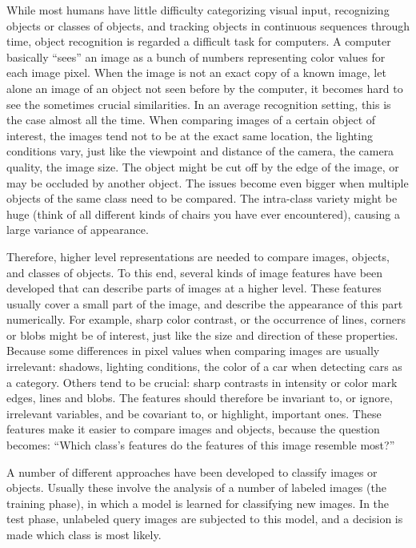 While most humans have little difficulty categorizing visual input, recognizing objects or classes of objects, and tracking objects in continuous sequences through time, object recognition is regarded a difficult task for computers. A computer basically ``sees'' an image as a bunch of numbers representing color values for each image pixel. When the image is not an exact copy of a known image, let alone an image of an object not seen before by the computer, it becomes hard to see the sometimes crucial similarities. In an average recognition setting, this is the case almost all the time. When comparing images of a certain object of interest, the images tend not to be at the exact same location, the lighting conditions vary, just like the viewpoint and distance of the camera, the camera quality, the image size. The object might be cut off by the edge of the image, or may be occluded by another object. The issues become even bigger when multiple objects of the same class need to be compared. The intra-class variety might be huge (think of all different kinds of chairs you have ever encountered), causing a large variance of appearance.

Therefore, higher level representations are needed to compare images, objects, and classes of objects. To this end, several kinds of image features have been developed that can describe parts of images at a higher level. These features usually cover a small part of the image, and describe the appearance of this part numerically. For example, sharp color contrast, or the occurrence of lines, corners or blobs might be of interest, just like the size and direction of these properties. Because some differences in pixel values when comparing images are usually irrelevant: shadows, lighting conditions, the color of a car when detecting cars as a category. Others tend to be crucial: sharp contrasts in intensity or color mark edges, lines and blobs. The features should therefore be invariant to, or ignore, irrelevant variables, and be covariant to, or highlight, important ones. These features make it easier to compare images and objects, because the question becomes: ``Which class's features do the features of this image resemble most?''

A number of different approaches have been developed to classify images or objects. Usually these involve the analysis of a number of labeled images (the training phase), in which a model is learned for classifying new images. In the test phase, unlabeled query images are subjected to this model, and a decision is made which class is most likely.\\


